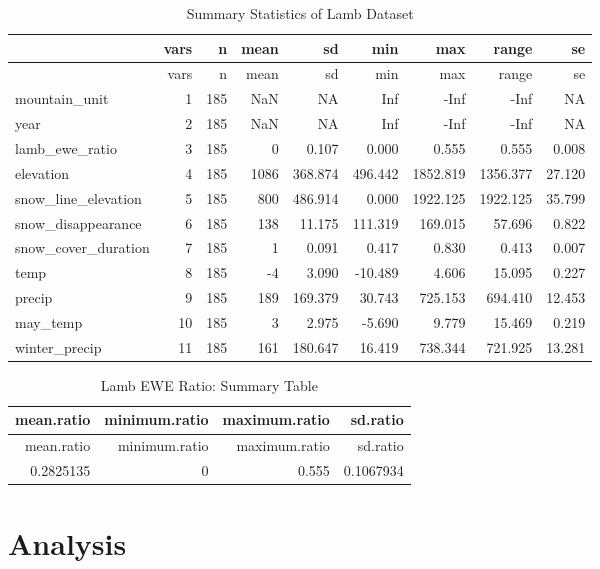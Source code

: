 \documentclass[
  12pt,
]{article}
\begin{document}
\begin{longtable}[]{@{}lrrrrrrrr@{}}
\caption{Summary Statistics of Lamb Dataset}\tabularnewline
\toprule
& vars & n & mean & sd & min & max & range & se \\
\midrule
\endfirsthead
\toprule
& vars & n & mean & sd & min & max & range & se \\
\midrule
\endhead
mountain\_unit & 1 & 185 & NaN & NA & Inf & -Inf & -Inf & NA \\
year & 2 & 185 & NaN & NA & Inf & -Inf & -Inf & NA \\
lamb\_ewe\_ratio & 3 & 185 & 0 & 0.107 & 0.000 & 0.555 & 0.555 &
0.008 \\
elevation & 4 & 185 & 1086 & 368.874 & 496.442 & 1852.819 & 1356.377 &
27.120 \\
snow\_line\_elevation & 5 & 185 & 800 & 486.914 & 0.000 & 1922.125 &
1922.125 & 35.799 \\
snow\_disappearance & 6 & 185 & 138 & 11.175 & 111.319 & 169.015 &
57.696 & 0.822 \\
snow\_cover\_duration & 7 & 185 & 1 & 0.091 & 0.417 & 0.830 & 0.413 &
0.007 \\
temp & 8 & 185 & -4 & 3.090 & -10.489 & 4.606 & 15.095 & 0.227 \\
precip & 9 & 185 & 189 & 169.379 & 30.743 & 725.153 & 694.410 &
12.453 \\
may\_temp & 10 & 185 & 3 & 2.975 & -5.690 & 9.779 & 15.469 & 0.219 \\
winter\_precip & 11 & 185 & 161 & 180.647 & 16.419 & 738.344 & 721.925 &
13.281 \\
\bottomrule
\end{longtable}

\begin{longtable}[]{@{}rrrr@{}}
\caption{Lamb EWE Ratio: Summary Table}\tabularnewline
\toprule
mean.ratio & minimum.ratio & maximum.ratio & sd.ratio \\
\midrule
\endfirsthead
\toprule
mean.ratio & minimum.ratio & maximum.ratio & sd.ratio \\
\midrule
\endhead
0.2825135 & 0 & 0.555 & 0.1067934 \\
\bottomrule
\end{longtable}

\newpage

\hypertarget{analysis}{%
\section{Analysis}\label{analysis}}
\end{document}
